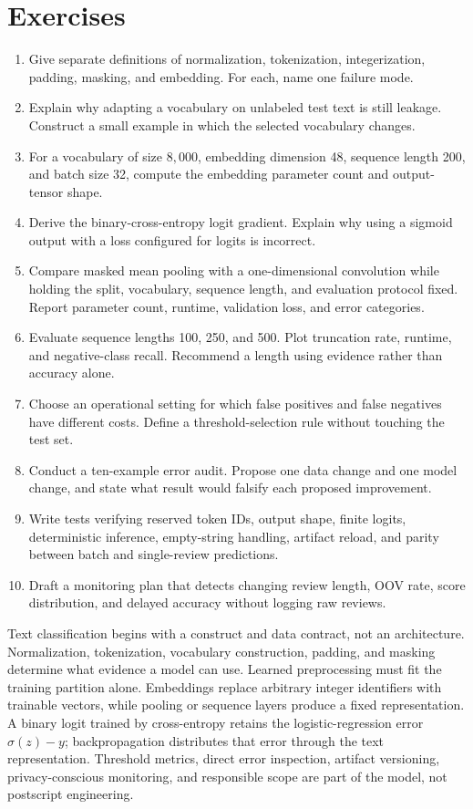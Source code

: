 \section{Exercises}
\begin{enumerate}
  \item Give separate definitions of normalization, tokenization,
  integerization, padding, masking, and embedding. For each, name one failure
  mode.
  \item Explain why adapting a vocabulary on unlabeled test text is still
  leakage. Construct a small example in which the selected vocabulary changes.
  \item For a vocabulary of size $8{,}000$, embedding dimension 48, sequence
  length 200, and batch size 32, compute the embedding parameter count and
  output-tensor shape.
  \item Derive the binary-cross-entropy logit gradient. Explain why using a
  sigmoid output with a loss configured for logits is incorrect.
  \item Compare masked mean pooling with a one-dimensional convolution while
  holding the split, vocabulary, sequence length, and evaluation protocol
  fixed. Report parameter count, runtime, validation loss, and error categories.
  \item Evaluate sequence lengths 100, 250, and 500. Plot truncation rate,
  runtime, and negative-class recall. Recommend a length using evidence rather
  than accuracy alone.
  \item Choose an operational setting for which false positives and false
  negatives have different costs. Define a threshold-selection rule without
  touching the test set.
  \item Conduct a ten-example error audit. Propose one data change and one model
  change, and state what result would falsify each proposed improvement.
  \item Write tests verifying reserved token IDs, output shape, finite logits,
  deterministic inference, empty-string handling, artifact reload, and parity
  between batch and single-review predictions.
  \item Draft a monitoring plan that detects changing review length, OOV rate,
  score distribution, and delayed accuracy without logging raw reviews.
\end{enumerate}

\begin{chapterreview}
Text classification begins with a construct and data contract, not an
architecture. Normalization, tokenization, vocabulary construction, padding,
and masking determine what evidence a model can use. Learned preprocessing
must fit the training partition alone. Embeddings replace arbitrary integer
identifiers with trainable vectors, while pooling or sequence layers produce a
fixed representation. A binary logit trained by cross-entropy retains the
logistic-regression error $\sigma(z)-y$; backpropagation distributes that error
through the text representation. Threshold metrics, direct error inspection,
artifact versioning, privacy-conscious monitoring, and responsible scope are
part of the model, not postscript engineering.
\end{chapterreview}

